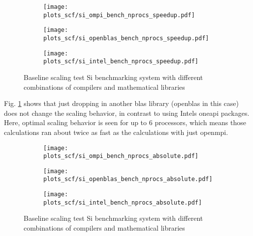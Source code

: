 \documentclass[main.tex]{subfiles}
\begin{document}
\begin{figure}[ht!]
\begin{subfigure}[b]{0.49\textwidth}
    \centering
    \texttt{[image: plots\_scf/si\_ompi\_bench\_nprocs\_speedup.pdf]}
\end{subfigure}
\begin{subfigure}[b]{0.49\textwidth}
    \centering
    \texttt{[image: plots\_scf/si\_openblas\_bench\_nprocs\_speedup.pdf]}
\end{subfigure}
\begin{subfigure}[b]{0.49\textwidth}
    \centering
    \texttt{[image: plots\_scf/si\_intel\_bench\_nprocs\_speedup.pdf]}
\end{subfigure}
\caption{Baseline scaling test Si benchmarking system with different combinations of compilers and mathematical libraries}
\label{fig:scaling_compilers_nprocs}
\end{figure}

Fig. \ref{fig:scaling_compilers_nprocs} shows that just dropping in another \gls{blas} library (\gls{openblas} in this case) does not change the scaling behavior, in contrast to using Intels \gls{oneapi} packages.
Here, optimal scaling behavior is seen for up to 6 processors, which means those calculations ran about twice as fast as the calculations with just \gls{openmpi}.

\begin{figure}[ht!]
\begin{subfigure}[b]{0.49\textwidth}
    \centering
    \texttt{[image: plots\_scf/si\_ompi\_bench\_nprocs\_absolute.pdf]}
\end{subfigure}
\begin{subfigure}[b]{0.49\textwidth}
    \centering
    \texttt{[image: plots\_scf/si\_openblas\_bench\_nprocs\_absolute.pdf]}
\end{subfigure}
\begin{subfigure}[b]{0.49\textwidth}
    \centering
    \texttt{[image: plots\_scf/si\_intel\_bench\_nprocs\_absolute.pdf]}
\end{subfigure}
\caption{Baseline scaling test Si benchmarking system with different combinations of compilers and mathematical libraries}
\label{fig:scaling_runtime_compilers_nprocs}
\end{figure}
\end{document}
